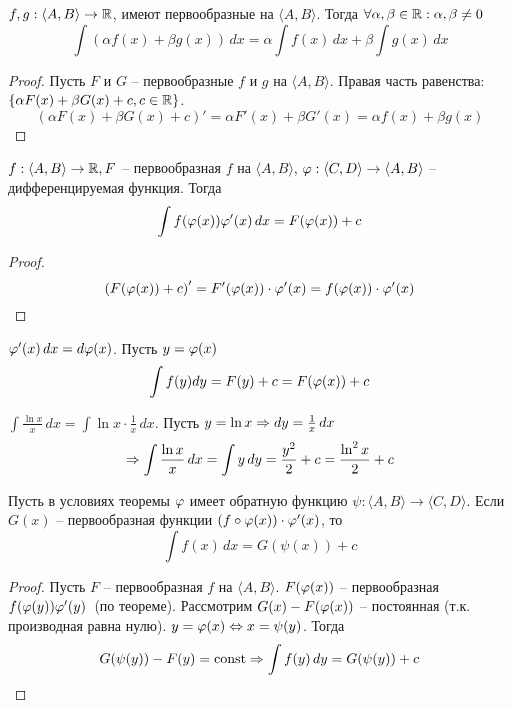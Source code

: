 \begin{Thm}
	$f, g : \langle A, B\rangle \to \mathbb{R}$, имеют первообразные на $\langle A, B\rangle$.
	Тогда $\forall \alpha, \beta \in \mathbb{R} : \alpha, \beta \neq 0$
	\[\int (\alpha f(x) + \beta g(x))\,dx = \alpha \int f(x) \,dx + \beta \int g(x) \,dx\] 
\end{Thm}

\begin{proof}
	Пусть $F$ и $G$ -- первообразные $f$ и $g$ на $\langle A, B\rangle$.
	Правая часть равенства: $\left\{\alpha F(x) + \beta G(x) + c, c \in \mathbb{R}\right\}$.
	\[\left(\alpha F(x) + \beta G(x) + c\right)' = \alpha F'(x) + \beta G'(x) = \alpha f(x) + \beta g(x)\]
\end{proof}

\begin{Thm}
	$f : \langle A, B\rangle \to \mathbb{R}, F$ -- первообразная $f$ на $\langle A, B\rangle$, $\varphi : \langle C, D\rangle \to \langle A, B\rangle$ -- дифференцируемая функция.
	Тогда 
	\[\int f(\varphi(x))\varphi'(x) \,dx = F(\varphi(x)) + c\]
\end{Thm}

\begin{proof}
	\[\left(F(\varphi(x)) + c\right)' = F'(\varphi(x)) \cdot \varphi'(x) = f(\varphi(x)) \cdot \varphi'(x)\]
\end{proof}

\begin{Rem}
	$\varphi'(x) \,dx = d \varphi(x)$. Пусть $y = \varphi (x)$ 
	\[\int f(y) dy = F(y) + c = F(\varphi(x)) + c\] 
\end{Rem}

\begin{Example}
	$\int \frac{\ln x}{x}\,dx = \int \ln x \cdot \frac{1}{x}\,dx$. Пусть $y = \ln x \Rightarrow dy = \frac{1}{x} \,dx$ 
	\[\Rightarrow \int \frac{\ln x}{x}\,dx = \int y \,dy = \frac{y^2}{2} + c = \frac{\ln^2 x}{2} + c\]
\end{Example}

\begin{Cons}
	Пусть в условиях теоремы $\varphi$ имеет обратную функцию $\psi : \langle A, B\rangle \to \langle C, D\rangle$. Если $G(x)$ -- первообразная функции $(f \circ \varphi(x)) \cdot \varphi'(x)$, то \[\int f(x) \,dx = G(\psi (x)) + c\]
\end{Cons}

\begin{proof}
	Пусть $F$ -- первообразная $f$ на $\langle A, B\rangle$.
	$F(\varphi(x))$ -- первообразная $f(\varphi(y)) \varphi'(y)$~(по теореме).
	Рассмотрим $G(x) - F(\varphi(x))$ -- постоянная (т.к. производная равна нулю).
	$y = \varphi(x) \Leftrightarrow x = \psi(y)$. Тогда
	\[G(\psi(y)) - F(y) = \operatorname{const} \Rightarrow \int f(y) \,dy = G(\psi(y)) + c \] 
\end{proof}

